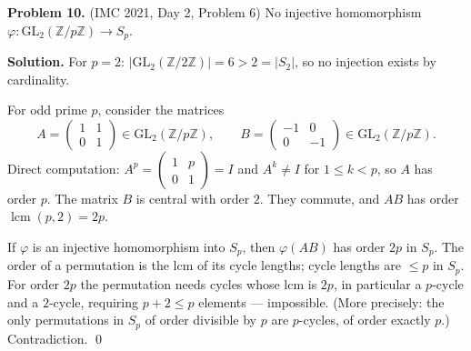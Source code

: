 \documentclass{article}
\newcommand{\Z}{\mathbb{Z}}
\begin{document}
\textbf{Problem 10.} (IMC 2021, Day 2, Problem 6)
No injective homomorphism \( \varphi : \mathrm{GL}_2(\Z/p\Z) \to S_p \).

\textbf{Solution.}
For \( p = 2 \): \( |\mathrm{GL}_2(\Z/2\Z)| = 6 > 2 = |S_2| \), so no injection exists by cardinality.

For odd prime \( p \), consider the matrices
\[
A = \begin{pmatrix} 1 & 1 \\ 0 & 1 \end{pmatrix} \in \mathrm{GL}_2(\Z/p\Z), \qquad B = \begin{pmatrix} -1 & 0 \\ 0 & -1 \end{pmatrix} \in \mathrm{GL}_2(\Z/p\Z).
\]
Direct computation: \( A^p = \begin{pmatrix} 1 & p \\ 0 & 1 \end{pmatrix} = I \) and \( A^k \neq I \) for \( 1 \leq k < p \), so \( A \) has order \( p \). The matrix \( B \) is central with order \( 2 \). They commute, and \( AB \) has order \( \operatorname{lcm}(p, 2) = 2p \).

If \( \varphi \) is an injective homomorphism into \( S_p \), then \( \varphi(AB) \) has order \( 2p \) in \( S_p \). The order of a permutation is the lcm of its cycle lengths; cycle lengths are \( \leq p \) in \( S_p \). For order \( 2p \) the permutation needs cycles whose lcm is \( 2p \), in particular a \( p \)-cycle and a \( 2 \)-cycle, requiring \( p + 2 \leq p \) elements — impossible. (More precisely: the only permutations in \( S_p \) of order divisible by \( p \) are \( p \)-cycles, of order exactly \( p \).) Contradiction. \qed
\end{document}
